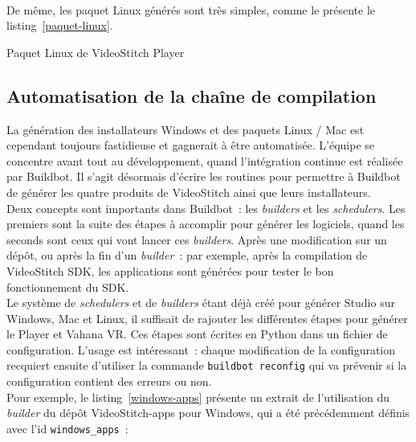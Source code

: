 \ \\
De même, les paquet Linux générés sont très simples, comme le présente le listing~\ref{paquet-linux}.
\begin{listing}
  \caption{Paquet Linux de VideoStitch Player}
  \label{paquet-linux}
\end{listing}

\subsection{Automatisation de la chaîne de compilation}
La génération des installateurs Windows et des paquets Linux / Mac est cependant
toujours fastidieuse et gagnerait à être automatisée. L'équipe se concentre avant
tout au développement, quand l'intégration continue est réalisée par Buildbot. 
Il s'agit désormais d'écrire les routines pour permettre à Buildbot de générer
les quatre produits de VideoStitch ainsi que leurs installateurs.\\
Deux concepts sont importants dans Buildbot~: les \textit{builders} et les \textit{schedulers}.
Les premiers sont la suite des étapes à accomplir pour générer les logiciels, quand
les seconds sont ceux qui vont lancer ces \textit{builders}. Après une modification
sur un dépôt, ou après la fin d'un \textit{builder}~: par exemple, après la compilation de
VideoStitch SDK, les applications sont générées pour tester le bon fonctionnement
du SDK.\\
Le système de \textit{schedulers} et de \textit{builders} étant déjà créé pour 
générer Studio sur Windows, Mac et Linux, il suffisait de rajouter les différentes 
étapes pour générer le Player et Vahana VR. Ces étapes sont écrites en Python dans un fichier de configuration.
L'usage est intéressant~: chaque modification de la configuration recquiert ensuite d'utiliser la commande
\texttt{buildbot reconfig} qui va prévenir si la configuration
contient des erreurs ou non.\\
\newline
Pour exemple, le listing~\ref{windows-apps} présente un extrait de l'utilisation 
du \textit{builder} du dépôt VideoStitch-apps pour Windows, qui a été précédemment 
définis avec l'id \texttt{windows_apps}~:
